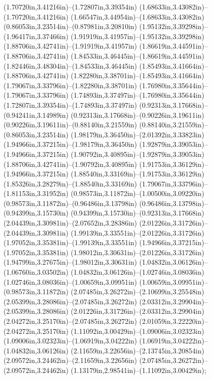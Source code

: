 (1.70720in,3.41216in)--(1.72807in,3.39354in) (1.68633in,3.43082in)--(1.70720in,3.41216in) (1.66547in,3.44954in)--(1.68633in,3.43082in) (0.86053in,3.23514in)--(0.87981in,3.20810in) (1.95132in,3.39298in)--(1.96417in,3.37466in) (1.91919in,3.41957in)--(1.95132in,3.39298in) (1.88706in,3.42741in)--(1.91919in,3.41957in) (1.86619in,3.44591in)--(1.88706in,3.42741in) (1.84533in,3.46445in)--(1.86619in,3.44591in) (1.82446in,3.48304in)--(1.84533in,3.46445in) (1.85493in,3.41664in)--(1.88706in,3.42741in) (1.82280in,3.38701in)--(1.85493in,3.41664in) (1.79067in,3.33796in)--(1.82280in,3.38701in) (1.76980in,3.35644in)--(1.79067in,3.33796in) (1.74893in,3.37497in)--(1.76980in,3.35644in) (1.72807in,3.39354in)--(1.74893in,3.37497in) (0.92313in,3.17668in)--(0.94241in,3.14989in) (0.92313in,3.17668in)--(0.90226in,3.19611in) (0.90226in,3.19611in)--(0.88140in,3.21559in) (0.88140in,3.21559in)--(0.86053in,3.23514in) (1.98179in,3.36450in)--(2.01392in,3.33823in) (1.94966in,3.37215in)--(1.98179in,3.36450in) (1.92879in,3.39053in)--(1.94966in,3.37215in) (1.90792in,3.40895in)--(1.92879in,3.39053in) (1.88706in,3.42741in)--(1.90792in,3.40895in) (1.91753in,3.36129in)--(1.94966in,3.37215in) (1.88540in,3.33169in)--(1.91753in,3.36129in) (1.85326in,3.28279in)--(1.88540in,3.33169in) (1.79067in,3.33796in)--(1.81153in,3.31952in) (0.98573in,3.11872in)--(1.00500in,3.09220in) (0.98573in,3.11872in)--(0.96486in,3.13798in) (0.96486in,3.13798in)--(0.94399in,3.15730in) (0.94399in,3.15730in)--(0.92313in,3.17668in) (2.04439in,3.30981in)--(2.07652in,3.28386in) (2.01226in,3.31726in)--(2.04439in,3.30981in) (1.99139in,3.33551in)--(2.01226in,3.31726in) (1.97052in,3.35381in)--(1.99139in,3.33551in) (1.94966in,3.37215in)--(1.97052in,3.35381in) (1.98012in,3.30631in)--(2.01226in,3.31726in) (1.94799in,3.27675in)--(1.98012in,3.30631in) (1.04832in,3.06126in)--(1.06760in,3.03502in) (1.04832in,3.06126in)--(1.02746in,3.08036in) (1.02746in,3.08036in)--(1.00659in,3.09951in) (1.00659in,3.09951in)--(0.98573in,3.11872in) (2.07485in,3.26272in)--(2.10699in,3.25548in) (2.05399in,3.28086in)--(2.07485in,3.26272in) (2.03312in,3.29904in)--(2.05399in,3.28086in) (2.01226in,3.31726in)--(2.03312in,3.29904in) (2.04272in,3.25170in)--(2.07485in,3.26272in) (2.01059in,3.22220in)--(2.04272in,3.25170in) (1.11092in,3.00429in)--(1.09006in,3.02323in) (1.09006in,3.02323in)--(1.06919in,3.04222in) (1.06919in,3.04222in)--(1.04832in,3.06126in) (2.11659in,3.22656in)--(2.13745in,3.20854in) (2.09572in,3.24462in)--(2.11659in,3.22656in) (2.07485in,3.26272in)--(2.09572in,3.24462in) (1.13179in,2.98541in)--(1.11092in,3.00429in);
